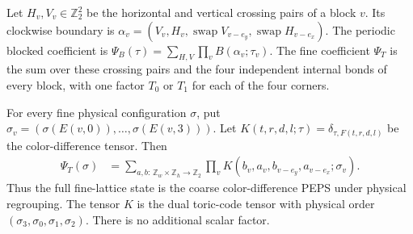\begin{definition}%
    \label{def:peps_kitaev_periodic_block_contraction}
    \leanok
    Let $H_v,V_v\in\mathbb Z_2^2$ be the horizontal and vertical crossing
    pairs of a block $v$. Its clockwise boundary is
    $\alpha_v=(V_v,H_v,\operatorname{swap}V_{v-e_y},
        \operatorname{swap}H_{v-e_x})$.
    The periodic blocked coefficient is
    $\Psi_B(\tau)=\sum_{H,V}\prod_v B(\alpha_v;\tau_v)$.
    The fine coefficient $\Psi_T$ is the sum over these crossing pairs and
    the four independent internal bonds of every block, with one factor
    $T_0$ or $T_1$ for each of the four corners.
\end{definition}

\begin{lemma}%
    \label{thm:peps_kitaev_global_blocking}
    \leanok
    For every fine physical configuration $\sigma$, put
    $\sigma_v=(\sigma(E(v,0)),\ldots,\sigma(E(v,3)))$.
    Let $K(t,r,d,l;\tau)=\delta_{\tau,F(t,r,d,l)}$ be the
    color-difference tensor. Then
    \begin{align}
        \Psi_T(\sigma)
         & =\sum_{a,b:\,\mathbb Z_w\times\mathbb Z_h\to\mathbb Z_2}
        \prod_v K(b_v,a_v,b_{v-e_y},a_{v-e_x};\sigma_v).
        \label{eq:peps_kitaev_global_blocking}
    \end{align}
    Thus the full fine-lattice state is the coarse color-difference PEPS
    under physical regrouping. The tensor $K$ is the dual toric-code tensor
    with physical order $(\sigma_3,\sigma_0,\sigma_1,\sigma_2)$.
    There is no additional scalar factor.
\end{lemma}

